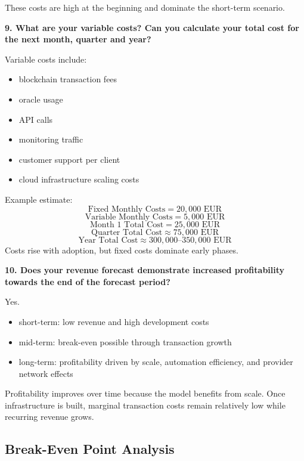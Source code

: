 \documentclass[12pt,a4paper,oneside]{article}
\theoremstyle{definition}
\theoremstyle{plain}
\begin{document}
These costs are high at the beginning and dominate the short-term scenario.

\vspace{0.5em}

\textbf{9. What are your variable costs? Can you calculate your total cost for the next month, quarter and year?}

Variable costs include:

\begin{itemize}
    \item blockchain transaction fees
    \item oracle usage
    \item API calls
    \item monitoring traffic
    \item customer support per client
    \item cloud infrastructure scaling costs
\end{itemize}

Example estimate:
\[
\text{Fixed Monthly Costs} = 20{,}000 \text{ EUR}
\]
\[
\text{Variable Monthly Costs} = 5{,}000 \text{ EUR}
\]
\[
\text{Month 1 Total Cost} = 25{,}000 \text{ EUR}
\]
\[
\text{Quarter Total Cost} \approx 75{,}000 \text{ EUR}
\]
\[
\text{Year Total Cost} \approx 300{,}000\text{--}350{,}000 \text{ EUR}
\]
Costs rise with adoption, but fixed costs dominate early phases.

\vspace{0.5em}

\textbf{10. Does your revenue forecast demonstrate increased profitability towards the end of the forecast period?}

Yes.

\begin{itemize}
    \item short-term: low revenue and high development costs
    \item mid-term: break-even possible through transaction growth
    \item long-term: profitability driven by scale, automation efficiency, and provider network effects
\end{itemize}

Profitability improves over time because the model benefits from scale. Once infrastructure is built, marginal transaction costs remain relatively low while recurring revenue grows. 

\subsection{Break-Even Point Analysis}
\end{document}

